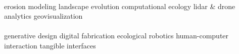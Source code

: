 \documentclass[]{baharmon-cv}
\begin{document}
\vspace*{0.3cm}
 \\ \vspace*{0.1cm}
\normalsize{
erosion modeling
\textbullet{}
landscape evolution
\textbullet{}
computational ecology 
\textbullet{}
lidar \& drone analytics
\textbullet{}
geovisualization
}
\\

 \vspace{0.1em} \\ \vspace*{0.1cm}
\normalsize{
generative design
\textbullet{}
digital fabrication
\textbullet{}
ecological robotics
\textbullet{}
human-computer interaction
\textbullet{}
tangible interfaces
}
\\


\sectiondivider


\end{document}
